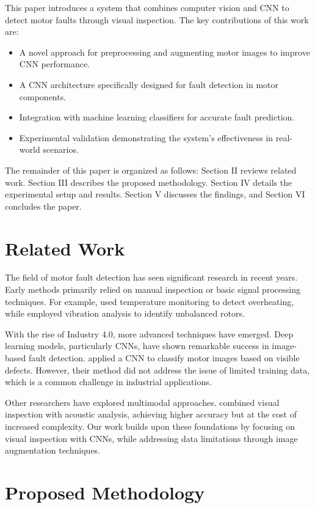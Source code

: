 \documentclass[conference]{IEEEtran}
\begin{document}
This paper introduces a system that combines computer vision and CNN to detect motor faults through visual inspection. The key contributions of this work are:
\begin{itemize}
    \item A novel approach for preprocessing and augmenting motor images to improve CNN performance.
    \item A CNN architecture specifically designed for fault detection in motor components.
    \item Integration with machine learning classifiers for accurate fault prediction.
    \item Experimental validation demonstrating the system's effectiveness in real-world scenarios.
\end{itemize}

The remainder of this paper is organized as follows: Section II reviews related work. Section III describes the proposed methodology. Section IV details the experimental setup and results. Section V discusses the findings, and Section VI concludes the paper.

\section{Related Work}

The field of motor fault detection has seen significant research in recent years. Early methods primarily relied on manual inspection or basic signal processing techniques. For example, \cite{ref3} used temperature monitoring to detect overheating, while \cite{ref4} employed vibration analysis to identify unbalanced rotors.

With the rise of Industry 4.0, more advanced techniques have emerged. Deep learning models, particularly CNNs, have shown remarkable success in image-based fault detection. \cite{ref5} applied a CNN to classify motor images based on visible defects. However, their method did not address the issue of limited training data, which is a common challenge in industrial applications.

Other researchers have explored multimodal approaches. \cite{ref6} combined visual inspection with acoustic analysis, achieving higher accuracy but at the cost of increased complexity. Our work builds upon these foundations by focusing on visual inspection with CNNs, while addressing data limitations through image augmentation techniques.

\section{Proposed Methodology}
\end{document}
